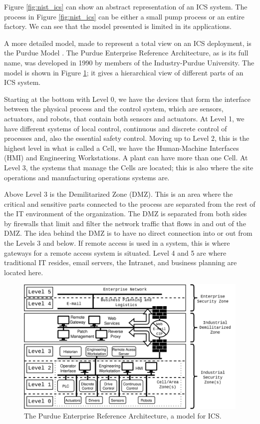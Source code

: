 Figure \ref{fig:nist_ics} can show an abstract representation of an ICS system. The process in Figure \ref{fig:nist_ics} can be either a small pump process or an entire factory. We can see that the model presented is limited in its applications. 

A more detailed model, made to represent a total view on an ICS deployment, is the Purdue Model \cite{williams1992purdue}. The Purdue Enterprise Reference Architecture, as is its full name, was developed in 1990 by members of the Industry-Purdue University. The model is shown in Figure \ref{fig:perdue}; it gives a hierarchical view of different parts of an ICS system. 

Starting at the bottom with Level 0, we have the devices that form the interface between the physical process and the control system, which are sensors, actuators, and robots, that contain both sensors and actuators. At Level 1, we have different systems of local control, continuous and discrete control of processes and, also the essential safety control. Moving up to Level 2, this is the highest level in what is called a Cell, we have the Human-Machine Interfaces (HMI) and Engineering Workstations. A plant can have more than one Cell. At Level 3, the systems that manage the Cells are located; this is also where the site operations and manufacturing operations systems are. 

Above Level 3 is the Demilitarized Zone (DMZ). This is an area where the critical and sensitive parts connected to the process are separated from the rest of the IT environment of the organization. The DMZ is separated from both sides by firewalls that limit and filter the network traffic that flows in and out of the DMZ. The idea behind the DMZ is to have no direct connection into or out from the Levels 3 and below. If remote access is used in a system, this is where gateways for a remote access system is situated. Level 4 and 5 are where traditional IT resides, email servers, the Intranet, and business planning are located here.

\begin{figure}[h]
\centering
\includegraphics[width=\textwidth]{images/purdue.png}
\caption{The Purdue Enterprise Reference Architecture, a model for ICS.}
\label{fig:perdue}
\end{figure}

